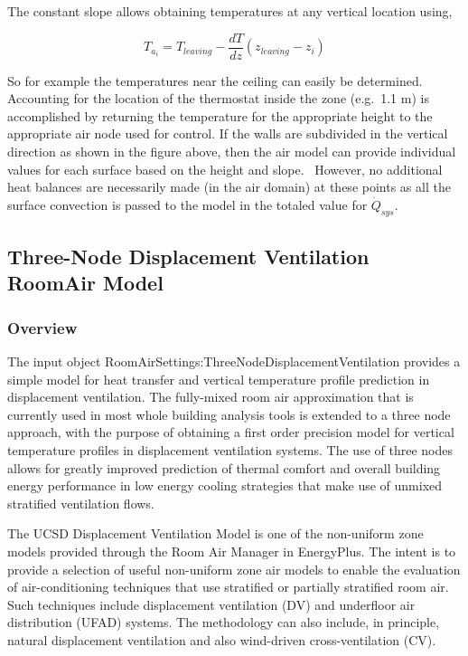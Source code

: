 {The constant slope allows obtaining temperatures at any vertical location using,

\begin{equation}
{T_{{a_i}}} = {T_{leaving}} - \frac{{dT}}{{dz}}({z_{leaving}} - {z_i})
\end{equation}

So for example the temperatures near the ceiling can easily be determined. Accounting for the location of the thermostat inside the zone (e.g.~1.1 m) is accomplished by returning the temperature for the appropriate height to the appropriate air node used for control. If the walls are subdivided in the vertical direction as shown in the figure above, then the air model can provide individual values for each surface based on the height and slope.~ However, no additional heat balances are necessarily made (in the air domain) at these points as all the surface convection is passed to the model in the totaled value for \({\dot Q_{sys}}\).

\subsection{Three-Node Displacement Ventilation RoomAir Model}\label{three-node-displacement-ventilation-roomair-model}

\subsubsection{Overview}\label{overview-005}

The input object RoomAirSettings:ThreeNodeDisplacementVentilation provides a simple model for heat transfer and vertical temperature profile prediction in displacement ventilation. The fully-mixed room air approximation that is currently used in most whole building analysis tools is extended to a three node approach, with the purpose of obtaining a first order precision model for vertical temperature profiles in displacement ventilation systems. The use of three nodes allows for greatly improved prediction of thermal comfort and overall building energy performance in low energy cooling strategies that make use of unmixed stratified ventilation flows.

The UCSD Displacement Ventilation Model is one of the non-uniform zone models provided through the Room Air Manager in EnergyPlus. The intent is to provide a selection of useful non-uniform zone air models to enable the evaluation of air-conditioning techniques that use stratified or partially stratified room air. Such techniques include displacement ventilation (DV) and underfloor air distribution (UFAD) systems. The methodology can also include, in principle, natural displacement ventilation and also wind-driven cross-ventilation (CV).

}
